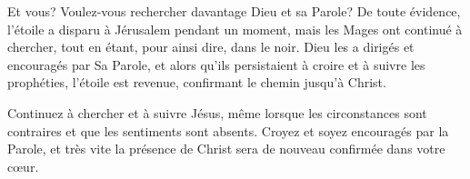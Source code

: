 Et vous? Voulez-vous rechercher davantage Dieu et sa Parole? De toute évidence, l'étoile a disparu à Jérusalem pendant un moment, mais les Mages ont continué à chercher, tout en étant, pour ainsi dire, dans le noir. Dieu les a dirigés et encouragés par Sa Parole, et alors qu'ils persistaient à croire et à suivre les prophéties, l'étoile est revenue, confirmant le chemin jusqu'à Christ.

Continuez à chercher et à suivre Jésus, même lorsque les circonstances sont contraires et que les sentiments sont absents. Croyez et soyez encouragés par la Parole, et très vite la présence de Christ sera de nouveau confirmée dans votre cœur.


\begin{dvquotes}
\end{dvquotes}
